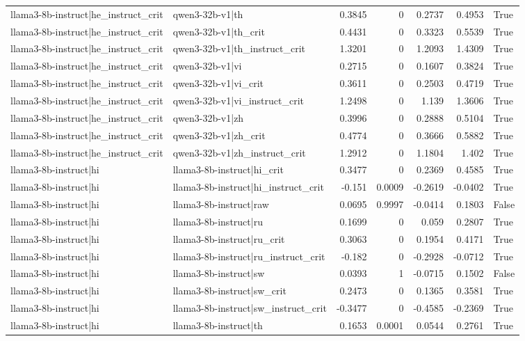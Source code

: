 \begin{table}
\begin{tabular}{l l r r r r l}
llama3-8b-instruct|he_instruct_crit & qwen3-32b-v1|th & 0.3845 & 0 & 0.2737 & 0.4953 & True \\
llama3-8b-instruct|he_instruct_crit & qwen3-32b-v1|th_crit & 0.4431 & 0 & 0.3323 & 0.5539 & True \\
llama3-8b-instruct|he_instruct_crit & qwen3-32b-v1|th_instruct_crit & 1.3201 & 0 & 1.2093 & 1.4309 & True \\
llama3-8b-instruct|he_instruct_crit & qwen3-32b-v1|vi & 0.2715 & 0 & 0.1607 & 0.3824 & True \\
llama3-8b-instruct|he_instruct_crit & qwen3-32b-v1|vi_crit & 0.3611 & 0 & 0.2503 & 0.4719 & True \\
llama3-8b-instruct|he_instruct_crit & qwen3-32b-v1|vi_instruct_crit & 1.2498 & 0 & 1.139 & 1.3606 & True \\
llama3-8b-instruct|he_instruct_crit & qwen3-32b-v1|zh & 0.3996 & 0 & 0.2888 & 0.5104 & True \\
llama3-8b-instruct|he_instruct_crit & qwen3-32b-v1|zh_crit & 0.4774 & 0 & 0.3666 & 0.5882 & True \\
llama3-8b-instruct|he_instruct_crit & qwen3-32b-v1|zh_instruct_crit & 1.2912 & 0 & 1.1804 & 1.402 & True \\
llama3-8b-instruct|hi & llama3-8b-instruct|hi_crit & 0.3477 & 0 & 0.2369 & 0.4585 & True \\
llama3-8b-instruct|hi & llama3-8b-instruct|hi_instruct_crit & -0.151 & 0.0009 & -0.2619 & -0.0402 & True \\
llama3-8b-instruct|hi & llama3-8b-instruct|raw & 0.0695 & 0.9997 & -0.0414 & 0.1803 & False \\
llama3-8b-instruct|hi & llama3-8b-instruct|ru & 0.1699 & 0 & 0.059 & 0.2807 & True \\
llama3-8b-instruct|hi & llama3-8b-instruct|ru_crit & 0.3063 & 0 & 0.1954 & 0.4171 & True \\
llama3-8b-instruct|hi & llama3-8b-instruct|ru_instruct_crit & -0.182 & 0 & -0.2928 & -0.0712 & True \\
llama3-8b-instruct|hi & llama3-8b-instruct|sw & 0.0393 & 1 & -0.0715 & 0.1502 & False \\
llama3-8b-instruct|hi & llama3-8b-instruct|sw_crit & 0.2473 & 0 & 0.1365 & 0.3581 & True \\
llama3-8b-instruct|hi & llama3-8b-instruct|sw_instruct_crit & -0.3477 & 0 & -0.4585 & -0.2369 & True \\
llama3-8b-instruct|hi & llama3-8b-instruct|th & 0.1653 & 0.0001 & 0.0544 & 0.2761 & True \\

\end{tabular}
\end{table}
